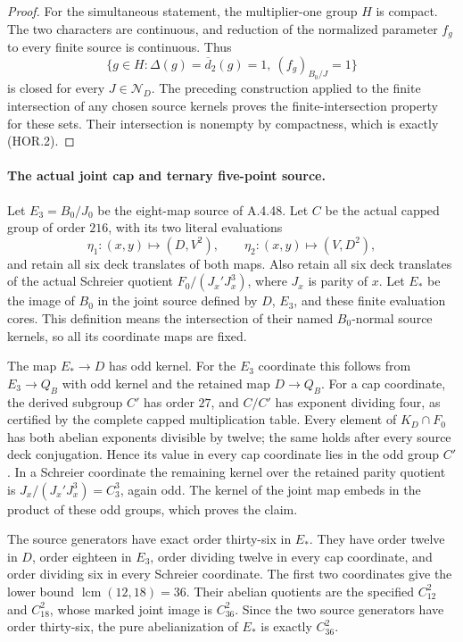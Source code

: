 \begin{proof}
For the simultaneous statement, the multiplier-one
group $H$ is compact.  The two characters are
continuous, and reduction of the normalized
parameter $f_g$ to every finite source is
continuous.  Thus
\[
 \{g\in H:\Delta(g)=\overline d_2(g)=1,
                         \ (f_g)_{B_0/J}=1\}
 \tag{HOR.8}
\]
is closed for every $J\in\mathcal N_D$.
The preceding construction applied to the finite
intersection of any chosen source kernels proves
the finite-intersection property for these sets.
Their intersection is nonempty by compactness,
which is exactly (HOR.2).
\end{proof}

\paragraph{The actual joint cap and ternary five-point source.}
Let $E_3=B_0/J_0$ be the eight-map source of
A.4.48.  Let $C$ be the actual capped group of order
$216$, with its two literal evaluations
\[
 \eta_1:(x,y)\longmapsto(D,V^2),\qquad
 \eta_2:(x,y)\longmapsto(V,D^2),
 \tag{HOR.9}
\]
and retain all six deck translates of both maps.
Also retain all six deck translates of the actual
Schreier quotient
$F_0/(J_x'J_x^3)$, where $J_x$ is parity of $x$.
Let $E_*$ be the image of $B_0$ in the joint
source defined by $D$, $E_3$, and these finite
evaluation cores.  This definition means the
intersection of their named $B_0$-normal source
kernels, so all its coordinate maps are fixed.

The map $E_*\to D$ has odd kernel.  For the $E_3$
coordinate this follows from
$E_3\to Q_B$ with odd kernel and the retained
map $D\to Q_B$.  For a cap coordinate, the
derived subgroup $C'$ has order $27$, and
$C/C'$ has exponent dividing four, as certified
by the complete capped multiplication table.
Every element of $K_D\cap F_0$ has both abelian
exponents divisible by twelve; the same holds
after every source deck conjugation.  Hence its
value in every cap coordinate lies in the odd
group $C'$.  In a Schreier coordinate the
remaining kernel over the retained parity
quotient is $J_x/(J_x'J_x^3)=C_3^3$, again odd.
The kernel of the joint map embeds in the product
of these odd groups, which proves the claim.

The source generators have exact order thirty-six
in $E_*$.  They have order twelve in $D$, order
eighteen in $E_3$, order dividing twelve in every
cap coordinate, and order dividing six in every
Schreier coordinate.  The first two coordinates
give the lower bound $\operatorname{lcm}(12,18)=36$.
Their abelian quotients are the specified
$C_{12}^2$ and $C_{18}^2$, whose marked joint image
is $C_{36}^2$.  Since the two source generators
have order thirty-six, the pure abelianization
of $E_*$ is exactly $C_{36}^2$.

